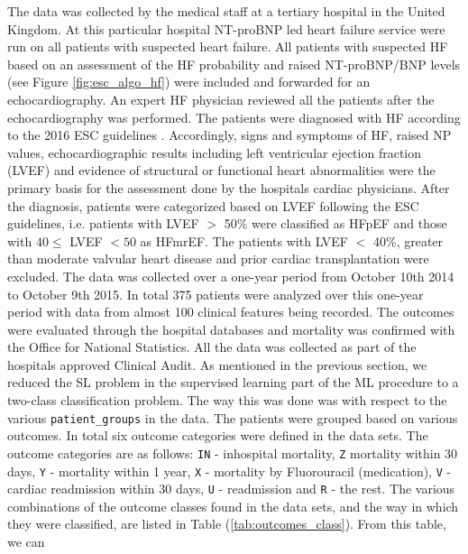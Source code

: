 \documentclass[../thesis.tex]{subfiles}
\begin{document}
\indent The data was collected by the medical staff at a tertiary hospital in the United Kingdom. At this particular hospital NT-proBNP led heart failure service were run on all patients with suspected heart failure. All patients with suspected HF based on an assessment of the HF probability and raised NT-proBNP/BNP levels (see Figure \ref{fig:esc_algo_hf}) were included and forwarded for an echocardiography. An expert HF physician reviewed all the patients after the echocardiography was performed. The patients were diagnosed with HF according to the 2016 ESC guidelines \citep{ponikowski2016}. Accordingly, signs and symptoms of HF, raised NP values, echocardiographic results including left ventricular ejection fraction (LVEF) and evidence of structural or functional heart abnormalities were the primary basis for the assessment done by the hospitals cardiac physicians. After the diagnosis, patients were categorized based on LVEF following the ESC guidelines, i.e. patients with LVEF $>$ 50\% were classified as HFpEF and those with $40 \leq$ LVEF $< 50$ as HFmrEF. The patients with LVEF $<$ 40\%, greater than moderate valvular heart disease and prior cardiac transplantation were excluded. The data was collected over a one-year period from October 10th 2014 to October 9th 2015. In total 375 patients were analyzed over this one-year period with data from almost 100 clinical features being recorded. The outcomes were evaluated through the hospital databases and mortality was confirmed with the Office for National Statistics. All the data was collected as part of the hospitals approved Clinical Audit. As mentioned in the previous section, we reduced the SL problem in the supervised learning part of the ML procedure to a two-class classification problem. The way this was done was with respect to the various \texttt{patient\_groups} in the data. The patients were grouped based on various \noindent outcomes. In total six outcome categories were  defined in the data sets. The outcome categories are as follows: \texttt{IN} - inhospital mortality, \texttt{Z} \noindent mortality within 30 days, \texttt{Y} - mortality within 1 year, \texttt{X} - mortality by Fluorouracil (medication), \texttt{V} - cardiac readmission within 30 days, \texttt{U} - readmission and \texttt{R} - the rest. The various combinations of the outcome classes found in the data sets, and the way in which they were classified, are listed in Table (\ref{tab:outcomes_class}). From this table, we can\\


\end{document}
